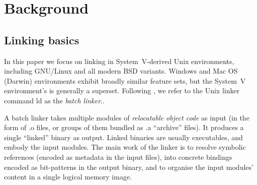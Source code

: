 \section{Background}

% 
% 
% 

\subsection{Linking basics}

In this paper we focus on linking in System~V-derived Unix environments,
including GNU/Linux and all modern BSD variants.
Windows and Mac OS (Darwin) environments exhibit broadly similar feature sets,
but the System~V environment's is generally a superset.
Following \citet{gingell_1987_shared}, we refer to the Unix linker command \textsf{ld}
as the \emph{batch linker}..



A batch linker takes multiple modules of \emph{relocatable object code} 
as input (in the form of \textsf{.o} files, or groups of them bundled as \textsf{.a} ``archive'' files).
It produces a single ``linked'' binary as output.
Linked binaries are usually executables, and embody the input modules.
The main work of the linker is to resolve symbolic references 
(encoded as metadata in the input files), 
into concrete bindings encoded as bit-patterns in the output binary,
and to organise the input modules' content
in a single logical memory image.

